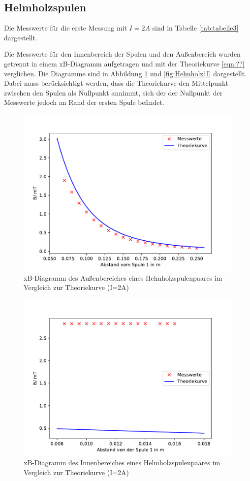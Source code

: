 \subsection{Helmholzspulen}
Die Messwerte für die erste Messung mit $I=2A$ sind in
Tabelle \ref{tab:tabelle3} dargestellt.

Die Messwerte für den Innenbereich der Spulen und den
Außenbereich wurden getrennt in einem xB-Diagramm
aufgetragen und mit der Theoriekurve \ref{eqn:??}
verglichen. Die Diagramme sind in Abbildung
\ref{fig:Helmholz1} und \ref{fig:Helmholz1I}
dargestellt. Dabei muss berücksichtigt werden, dass die
Theoriekurve den Mittelpunkt zwischen den Spulen als
Nullpunkt annimmt, sich der der Nullpunkt der
Messwerte jedoch an Rand der ersten Spule befindet.
\begin{figure}
  \centering
  \includegraphics{Helmholz1.pdf}
  \caption{xB-Diagramm des Außenbereiches eines
  Helmholzspulenpaares im Vergleich zur Theoriekurve
  (I=2A)}
  \label{fig:Helmholz1}
\end{figure}
\begin{figure}
  \centering
  \includegraphics{Helmholz1I.pdf}
  \caption{xB-Diagramm des Innenbereiches eines
  Helmholzspulenpaares im Vergleich zur Theoriekurve
  (I=2A)}
  \label{fif:Helmholz1I}
\end{figure}

